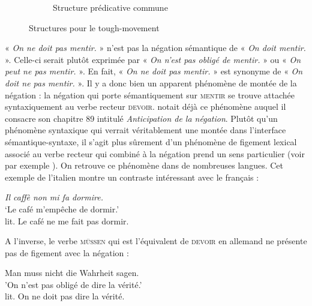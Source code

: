 {\begin{figure}[H]
\begin{subfigure}[h]{\textwidth}
		\caption{Structure prédicative commune}
	\end{subfigure}
\caption{Structures pour le tough-movement\label{fig:13-tough}}
\end{figure}

 « \textit{On ne doit pas mentir.} » n’est pas la négation sémantique de « \textit{On doit mentir.} ». Celle-ci serait plutôt exprimée par « \textit{On n’est pas obligé de mentir.} » ou « \textit{On peut ne pas mentir.} ». En fait, « \textit{On ne doit pas mentir.} » est synonyme de « \textit{On doit ne pas mentir.} ». Il y a donc bien un apparent phénomène de montée de la négation : la négation qui porte sémantiquement sur \textsc{mentir} se trouve attachée syntaxiquement au verbe recteur \textsc{devoir}. \citet{tesniere1959elements} notait déjà ce phénomène auquel il consacre son chapitre 89 intitulé \textit{Anticipation de la négation}. Plutôt qu’un phénomène syntaxique qui verrait véritablement une montée dans l’interface sémantique-syntaxe, il s’agit plus sûrement d’un phénomène de figement lexical associé au verbe recteur qui combiné à la négation prend un sens particulier (voir par exemple \cite{forest1994negation}). On retrouve ce phénomène dans de nombreuses langues. Cet exemple de l’italien montre un contraste intéressant avec le français :

\begin{exe}
\exi{} \textit{Il caffè non mi fa dormire.}\\
‘Le café m’empêche de dormir.’\\
lit. Le café ne me fait pas dormir.
\end{exe}

A l'inverse, le verbe \textsc{müssen} qui est l'équivalent de \textsc{devoir} en allemand ne présente pas de figement avec la négation :

\begin{exe}
\exi{} Man muss nicht die Wahrheit sagen.\\
'On n'est pas obligé de dire la vérité.'\\
lit. On ne doit pas dire la vérité.
\end{exe}}

